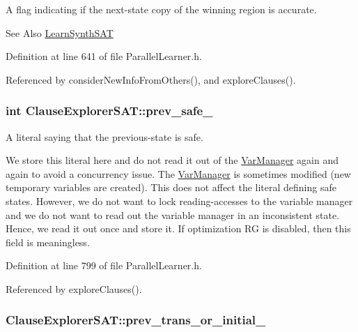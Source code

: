 A flag indicating if the next-\/state copy of the winning region is accurate. 

\begin{DoxySeeAlso}{See Also}
\hyperlink{classLearnSynthSAT}{Learn\-Synth\-S\-A\-T} 
\end{DoxySeeAlso}


Definition at line 641 of file Parallel\-Learner.\-h.



Referenced by consider\-New\-Info\-From\-Others(), and explore\-Clauses().

\hypertarget{classClauseExplorerSAT_ab98b3cf3447591b3e390e3d3a1d595e5}{
\subsubsection[{prev\-\_\-safe\-\_\-}]{\setlength{\rightskip}{0pt plus 5cm}int Clause\-Explorer\-S\-A\-T\-::prev\-\_\-safe\-\_\-\hspace{0.3cm}{\ttfamily [protected]}}}\label{classClauseExplorerSAT_ab98b3cf3447591b3e390e3d3a1d595e5}


A literal saying that the previous-\/state is safe. 

We store this literal here and do not read it out of the \hyperlink{classVarManager}{Var\-Manager} again and again to avoid a concurrency issue. The \hyperlink{classVarManager}{Var\-Manager} is sometimes modified (new temporary variables are created). This does not affect the literal defining safe states. However, we do not want to lock reading-\/accesses to the variable manager and we do not want to read out the variable manager in an inconsistent state. Hence, we read it out once and store it. If optimization R\-G is disabled, then this field is meaningless. 

Definition at line 799 of file Parallel\-Learner.\-h.



Referenced by explore\-Clauses().

\hypertarget{classClauseExplorerSAT_a445dd961b44b493e184ff42207132ea1}{
\subsubsection[{prev\-\_\-trans\-\_\-or\-\_\-initial\-\_\-}]{ Clause\-Explorer\-S\-A\-T\-::prev\-\_\-trans\-\_\-or\-\_\-initial\-\_\-\hspace{0.3cm}{\ttfamily [protected]}}}\label{classClauseExplorerSAT_a445dd961b44b493e184ff42207132ea1}


